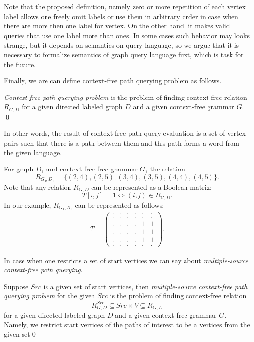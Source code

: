 Note that the proposed definition, namely zero or more repetition of each vertex label allows one freely omit labels or use them in arbitrary order in case when there are more then one label for vertex. 
On the other hand, it makes valid queries that use one label more than ones. 
In some cases such behavior may looks strange, but it depends on semantics on query language, so we argue that it is necessary to formalize semantics of graph query language first, which is task for the future.  

Finally, we are can define context-free path querying problem as follows. 
\begin{definition}
    \emph{Context-free path querying problem} is the problem of finding context-free relation $R_{G, D}$ for a given directed labeled graph $D$ and a given context-free grammar $G$. \qed
\end{definition} 

In other words, the result of context-free path query evaluation is a set of vertex pairs such that there is a path between them and this path forms a word from the given language.
    
For graph $D_1$ and context-free free grammar $G_1$ the relation $$R_{G_1, D_1} = \{(2, 4), (2, 5), (3, 4), (3, 5), (4, 4), (4, 5)\}.$$ 
Note that any relation $R_{G, D}$ can be represented as a Boolean matrix: $$T[i,j] = 1 \iff (i,j) \in R_{G, D}.$$
In our example, $R_{G_1, D_1}$ can be represented as follows:
\begin{align*}
T =
\begin{pmatrix}
    . & . & . & . & . & . \\
    . & . & . & . & . & . \\
    . & . & . & . & 1 & 1 \\
    . & . & . & . & 1 & 1 \\ 
    . & . & . & . & 1 & 1 \\ 
    . & . & . & . & . & .
\end{pmatrix}.
\end{align*}

In case when one restricts a set of start vertices we can say about \textit{multiple-source context-free path querying}.

\begin{definition}
    Suppose $Src$ is a given set of start vertices, then \textit{multiple-source context-free path querying problem} for the given $Src$ is the problem of finding context-free relation $$R_{G, D}^{Src} \subseteq Src\times V \subseteq R_{G,D}$$ for a given directed labeled graph $D$ and a given context-free grammar $G$. Namely, we restrict start vertices of the paths of interest to be a vertices from the given set\qed
\end{definition}

